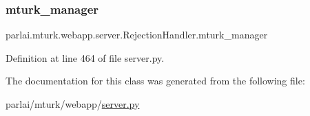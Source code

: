 \subsubsection{\texorpdfstring{mturk\+\_\+manager}{mturk\_manager}}
{\footnotesize\ttfamily parlai.\+mturk.\+webapp.\+server.\+Rejection\+Handler.\+mturk\+\_\+manager}



Definition at line 464 of file server.\+py.



The documentation for this class was generated from the following file\+:\begin{DoxyCompactItemize}
\item 
parlai/mturk/webapp/\hyperlink{server_8py}{server.\+py}\end{DoxyCompactItemize}
